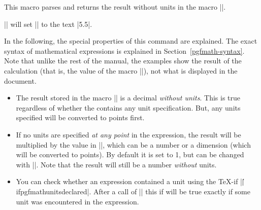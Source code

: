 \begin{command}{\pgfmathparse{}}
  This macro parses  and returns the result without
  units in  the macro |\pgfmathresult|.

  \example |\pgfmathparse{2pt+3.5pt}| will set |\pgfmathresult| to the
  text |5.5|.

  In the following, the special properties of this command are
  explained. The exact syntax of mathematical expressions is explained
  in Section~\ref{pgfmath-syntax}. Note that unlike the rest of the  
  manual, the examples show the result of the calculation (that is,
  the value of the macro |\pgfmathresult|), not what is displayed in
  the document.  

  \begin{itemize}
  \item
    The result stored in the macro |\pgfmathresult| is a decimal
    \emph{without units}. This is true regardless of whether the
     contains any unit specification. But, any units
    specified will be converted to points first.
\begin{codeexample}[post=\tt\footnotesize\pgfmathresult]
\pgfmathparse{2pt+3.4pt}
\end{codeexample}

\begin{codeexample}[post=\tt\footnotesize\pgfmathresult]
\pgfmathparse{2cm+3.4cm}
\end{codeexample}

  \item If no units are specified \emph{at any point} in the 
    expression, the result will be multiplied by the value in 
    |\pgfmathresultunitscale|, which can be a number or a dimension 
    (which will be converted to points). By default it is set to 1, 
    but can be changed with |\pgfmathsetresultunitscale|. Note that 
    the result will still be a number \emph{without} units.

\begin{codeexample}[post=\tt\footnotesize\pgfmathresult]
\pgfmathparse{2pt+3.4pt}
\end{codeexample}

\begin{codeexample}[post=\tt\footnotesize\pgfmathresult]
\pgfmathsetresultunitscale{1cm}
\end{codeexample}

    \pgfmathsetresultunitscale{1pt}
    
  \item You can check whether an expression contained a unit using 
    the \TeX-if |\||ifpgfmathunitsdeclared|. After a call
    of |\pgfmathparse| this if will be true exactly if some unit was
    encountered in the expression.
    

\end{itemize}
\end{command}
